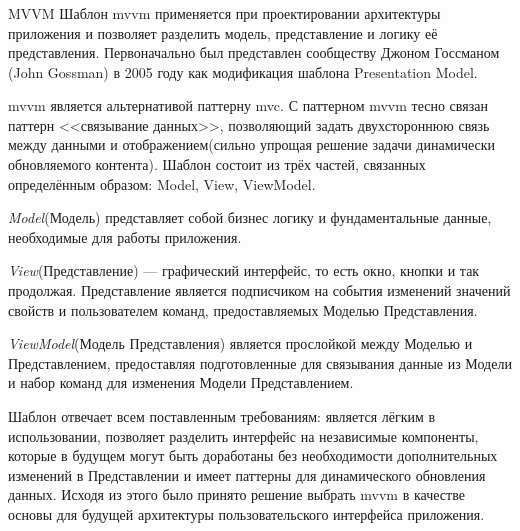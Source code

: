 \subsubsection {} MVVM
Шаблон \gls{mvvm} применяется при проектировании архитектуры приложения и позволяет разделить модель, представление и логику её представления. Первоначально был представлен сообществу Джоном Госсманом (John Gossman) в 2005 году как модификация шаблона Presentation Model. \cite{wiki:mvvm}

\gls{mvvm} является альтернативой паттерну \gls{mvc}. С паттерном \gls{mvvm} тесно связан паттерн <<связывание данных>>, позволяющий задать двухстороннюю связь между данными и отображением(сильно упрощая решение задачи динамически обновляемого контента). Шаблон состоит из трёх частей, связанных определённым образом: Model, View, ViewModel.

\emph{Model}(Модель) представляет собой бизнес логику и фундаментальные данные, необходимые для работы приложения.

\emph{View}(Представление) --- графический интерфейс, то есть окно, кнопки и так продолжая. Представление является подписчиком на события изменений значений свойств и пользователем команд, предоставляемых Моделью Представления.

\emph{ViewModel}(Модель Представления) является прослойкой между Моделью и Представлением, предоставляя подготовленные для связывания данные из Модели и набор команд для изменения Модели Представлением.

Шаблон отвечает всем поставленным требованиям: является лёгким в использовании, позволяет разделить интерфейс на независимые компоненты, которые в будущем могут быть доработаны без необходимости дополнительных изменений в Представлении и имеет паттерны для динамического обновления данных. Исходя из этого было принято решение выбрать \gls{mvvm} в качестве основы для будущей архитектуры пользовательского интерфейса приложения.